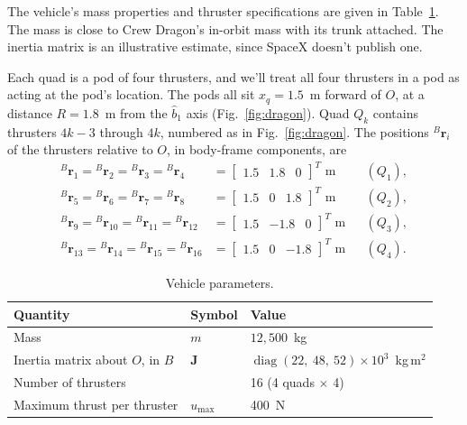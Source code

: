 \documentclass[11pt,letterpaper]{article}
\newcommand{\bJ}{\mathbf{J}}
\newcommand{\br}{\mathbf{r}}
\begin{document}
The vehicle's mass properties and thruster specifications are given in Table~\ref{tab:vehicle}. The mass is close to Crew Dragon's in-orbit mass with its trunk attached. The inertia matrix is an illustrative estimate, since SpaceX doesn't publish one.

Each quad is a pod of four thrusters, and we'll treat all four thrusters in a pod as acting at the pod's location. The pods all sit $x_q = 1.5$~m forward of $O$, at a distance $R = 1.8$~m from the $\hat b_1$ axis (Fig.~\ref{fig:dragon}). Quad $Q_k$ contains thrusters $4k-3$ through $4k$, numbered as in Fig.~\ref{fig:dragon}. The positions ${}^{B}\br_i$ of the thrusters relative to $O$, in body-frame components, are
\begin{align*}
{}^{B}\br_1 = {}^{B}\br_2 = {}^{B}\br_3 = {}^{B}\br_4 &= \begin{bmatrix} 1.5 & 1.8 & 0 \end{bmatrix}^T\text{ m} && (Q_1), \\
{}^{B}\br_5 = {}^{B}\br_6 = {}^{B}\br_7 = {}^{B}\br_8 &= \begin{bmatrix} 1.5 & 0 & 1.8 \end{bmatrix}^T\text{ m} && (Q_2), \\
{}^{B}\br_9 = {}^{B}\br_{10} = {}^{B}\br_{11} = {}^{B}\br_{12} &= \begin{bmatrix} 1.5 & -1.8 & 0 \end{bmatrix}^T\text{ m} && (Q_3), \\
{}^{B}\br_{13} = {}^{B}\br_{14} = {}^{B}\br_{15} = {}^{B}\br_{16} &= \begin{bmatrix} 1.5 & 0 & -1.8 \end{bmatrix}^T\text{ m} && (Q_4).
\end{align*}

\begin{table}[H]
\centering
\small
\begin{tabular}{lll}
\toprule
Quantity & Symbol & Value \\
\midrule
Mass & $m$ & $12{,}500$~kg \\
Inertia matrix about $O$, in $B$ & $\bJ$ & $\operatorname{diag}\left(22,\ 48,\ 52\right)\times10^{3}$~kg\,m$^2$ \\
Number of thrusters & & 16 (4 quads $\times$ 4) \\
Maximum thrust per thruster & $u_{\max}$ & 400~N \\
\bottomrule
\end{tabular}
\caption{Vehicle parameters.}
\label{tab:vehicle}
\end{table}
\end{document}
